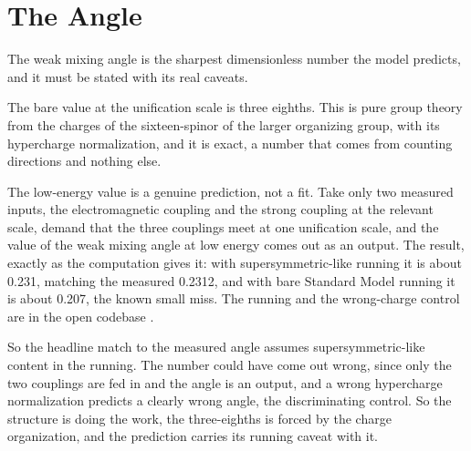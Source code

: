 \section{The Angle}

The weak mixing angle is the sharpest dimensionless number the model predicts, and it must be stated with its real
caveats.

The bare value at the unification scale is three eighths. This is pure group theory from the charges of the sixteen-spinor
of the larger organizing group, with its hypercharge normalization, and it is exact, a number that comes from counting
directions and nothing else.

The low-energy value is a genuine prediction, not a fit. Take only two measured inputs, the electromagnetic coupling and
the strong coupling at the relevant scale, demand that the three couplings meet at one unification scale, and the value
of the weak mixing angle at low energy comes out as an output. The result, exactly as the computation gives it: with
supersymmetric-like running it is about 0.231, matching the measured 0.2312, and with bare Standard Model running it is
about 0.207, the known small miss. The running and the wrong-charge control are in the open codebase \cite{cluesurf2026repo}.

So the headline match to the measured angle assumes supersymmetric-like content in the running. The number could have
come out wrong, since only the two couplings are fed in and the angle is an
output, and a wrong hypercharge normalization predicts a clearly wrong angle, the discriminating control. So the
structure is doing the work, the three-eighths is forced by the charge organization, and the prediction carries its
running caveat with it.
